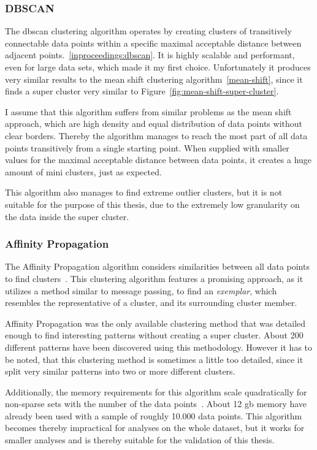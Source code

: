 \subsubsection{DBSCAN}
The \ac{dbscan} clustering algorithm operates by creating clusters of transitively connectable data points within a specific maximal acceptable distance between adjacent points.~\ref{inproceedings:dbscan}.
It is highly scalable and performant, even for large data sets, which made it my first choice.
Unfortunately it produces very similar results to the mean shift clustering algorithm~\ref{mean-shift}, since it finds a super cluster very similar to Figure~\ref{fig:mean-shift-super-cluster}.

I assume that this algorithm suffers from similar problems as the mean shift approach, which are high density and equal distribution of data points without clear borders.
Thereby the algorithm manages to reach the most part of all data points transitively from a single starting point.
When supplied with smaller values for the maximal acceptable distance between data points, it creates a huge amount of mini clusters, just as expected.

This algorithm also manages to find extreme outlier clusters, but it is not suitable for the purpose of this thesis, due to the extremely low granularity on the data inside the super cluster.


\subsubsection{Affinity Propagation}
The Affinity Propagation algorithm considers similarities between all data points to find clusters~\cite{article:affinity-propagation}.
This clustering algorithm features a promising approach, as it utilizes a method similar to message passing, to find an \emph{exemplar}, which resembles the representative of a cluster, and its surrounding cluster member.

Affinity Propagation was the only available clustering method that was detailed enough to find interesting patterns without creating a super cluster.
About 200 different patterns have been discovered using this methodology.
However it has to be noted, that this clustering method is sometimes a little too detailed, since it split very similar patterns into two or more different clusters.

Additionally, the memory requirements for this algorithm scale quadratically for non-sparse sets with the number of the data points~\cite[p.~ii]{article:affinity-propagation}.
About 12 \ac{gb} memory have already been used with a sample of roughly 10.000 data points.
This algorithm becomes thereby impractical for analyses on the whole dataset, but it works for smaller analyses and is thereby suitable for the validation of this thesis.
